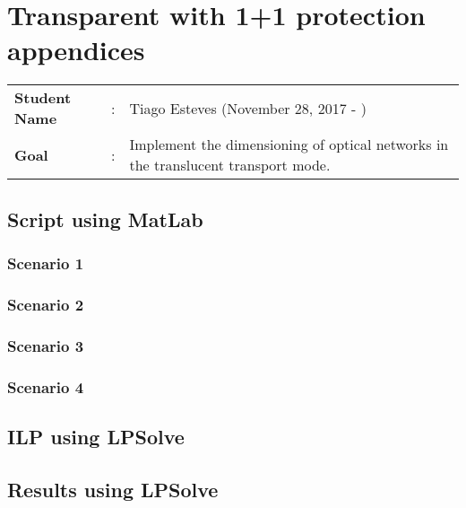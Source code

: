 \clearpage

\section{Transparent with 1+1 protection appendices}
\begin{tcolorbox}	
\begin{tabular}{p{2.75cm} p{0.2cm} p{10.5cm}} 	
\textbf{Student Name}  &:& Tiago Esteves    (November 28, 2017 - )\\
\textbf{Goal}          &:& Implement the dimensioning of optical networks in the translucent transport mode.
\end{tabular}
\end{tcolorbox}


\subsection{Script using MatLab}

\subsubsection{Scenario 1}

\subsubsection{Scenario 2}

\subsubsection{Scenario 3}

\subsubsection{Scenario 4}


\subsection{ILP using LPSolve}

\subsection{Results using LPSolve}
